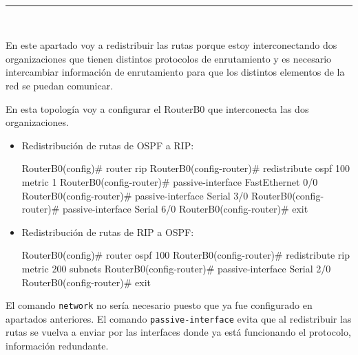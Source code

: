 
\begin{center}
	{\fboxrule=4pt } \\
	\setcounter{chapter}{3}
	\setcounter{section}{0}
	\rule{15cm}{0pt} \\
\end{center}
\par En este apartado voy a redistribuir las rutas porque estoy interconectando dos organizaciones que tienen distintos protocolos de enrutamiento y es necesario intercambiar información de enrutamiento para que los distintos elementos de la red se puedan comunicar.
\par En esta topología voy a configurar el RouterB0 que interconecta las dos organizaciones.
\begin{itemize}
	\item Redistribución de rutas de OSPF a RIP:
\begin{listing}[style=consola]
RouterB0(config)# router rip
RouterB0(config-router)# redistribute ospf 100 metric 1
RouterB0(config-router)# passive-interface FastEthernet 0/0
RouterB0(config-router)# passive-interface Serial 3/0
RouterB0(config-router)# passive-interface Serial 6/0
RouterB0(config-router)# exit
\end{listing}
	\item Redistribución de rutas de RIP a OSPF:
\begin{listing}[style=consola]
RouterB0(config)# router ospf 100
RouterB0(config-router)# redistribute rip metric 200 subnets 
RouterB0(config-router)# passive-interface Serial 2/0
RouterB0(config-router)# exit
\end{listing}
\end{itemize}
\par El comando \texttt{network} no sería necesario puesto que ya fue configurado en apartados anteriores. El comando \texttt{passive-interface} evita que al redistribuir las rutas se vuelva a enviar por las interfaces donde ya está funcionando el protocolo, información redundante.





\newpage